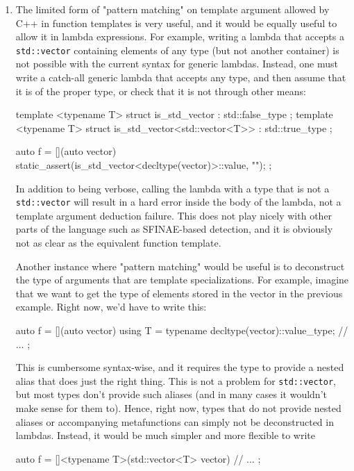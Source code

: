 \documentclass{wg21}
\newcommand{\cc}[1]{\texttt{#1}}
\begin{document}
\begin{enumerate}
\item
The limited form of "pattern matching" on template argument allowed by C++
in function templates is very useful, and it would be equally useful to allow
it in lambda expressions. For example, writing a lambda that accepts a
\cc{std::vector} containing elements of any type (but not another container)
is not possible with the current syntax for generic lambdas. Instead, one
must write a catch-all generic lambda that accepts any type, and then assume
that it is of the proper type, or check that it is not through other means:

\begin{cpp}
template <typename T> struct is_std_vector                 : std::false_type { };
template <typename T> struct is_std_vector<std::vector<T>> : std::true_type { };

auto f = [](auto vector) {
  static_assert(is_std_vector<decltype(vector)>::value, "");
};
\end{cpp}

In addition to being verbose, calling the lambda with a type that is not a
\cc{std::vector} will result in a hard error inside the body of the lambda, not
a template argument deduction failure. This does not play nicely with other
parts of the language such as SFINAE-based detection, and it is obviously
not as clear as the equivalent function template.

Another instance where "pattern matching" would be useful is to deconstruct
the type of arguments that are template specializations. For example, imagine
that we want to get the type of elements stored in the vector in the previous
example. Right now, we'd have to write this:

\begin{cpp}
auto f = [](auto vector) {
  using T = typename decltype(vector)::value_type;
  // ...
};
\end{cpp}

This is cumbersome syntax-wise, and it requires the type to provide a nested
alias that does just the right thing. This is not a problem for \cc{std::vector},
but most types don't provide such aliases (and in many cases it wouldn't make
sense for them to). Hence, right now, types that do not provide nested aliases
or accompanying metafunctions can simply not be deconstructed in lambdas.
Instead, it would be much simpler and more flexible to write

\begin{cpp}
auto f = []<typename T>(std::vector<T> vector) {
  // ...
};
\end{cpp}



\end{enumerate}
\end{document}
